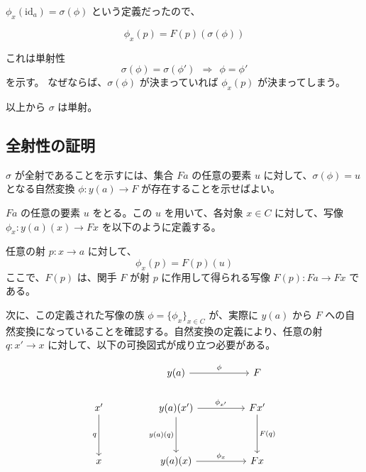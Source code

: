 \documentclass[uplatex,a4j,12pt,dvipdfmx]{jsarticle}
\begin{document}
$\phi_{x}( \text{id}_{a} ) = \sigma(\phi)$ という定義だったので、

\[
	\phi_{x}(p) = F(p)(\sigma(\phi))
\]

これは単射性
\[
	\sigma(\phi) = \sigma(\phi') \ \ \Rightarrow \ \ \phi = \phi'
\]
を示す。
なぜならば、$\sigma(\phi)$ が決まっていれば $\phi_{x}(p)$ が決まってしまう。

以上から $\sigma$ は単射。



\subsection{全射性の証明}

$\sigma$ が全射であることを示すには、集合 $Fa$ の任意の要素 $u$ に対して、$\sigma(\phi) = u$ となる自然変換 $\phi: y(a) \to F$ が存在することを示せばよい。

$Fa$ の任意の要素 $u$ をとる。この $u$ を用いて、各対象 $x \in C$ に対して、写像 $\phi_x : y(a)(x) \to Fx$ を以下のように定義する。

任意の射 $p: x \to a$ に対して、
$$ \phi_x(p) = F(p)(u) $$
ここで、$F(p)$ は、関手 $F$ が射 $p$ に作用して得られる写像 $F(p): Fa \to Fx$ である。

次に、この定義された写像の族 $\phi = \{\phi_x\}_{x \in C}$ が、実際に $y(a)$ から $F$ への自然変換になっていることを確認する。自然変換の定義により、任意の射 $q: x' \to x$ に対して、以下の可換図式が成り立つ必要がある。

\[
	\begin{tikzcd}
		&  & y(a) \arrow[rr, "\phi"]                                 &  & F                      \\
		x' \arrow[dd, "q"'] &  & y(a)(x') \arrow[dd, "y(a)(q)"'] \arrow[rr, "\phi_{x'}"] &  & Fx' \arrow[dd, "F(q)"] \\
		&  &                                                         &  &                        \\
		x                   &  & y(a)(x) \arrow[rr, "\phi_{x}"]                          &  & Fx
	\end{tikzcd}
\]
\end{document}
